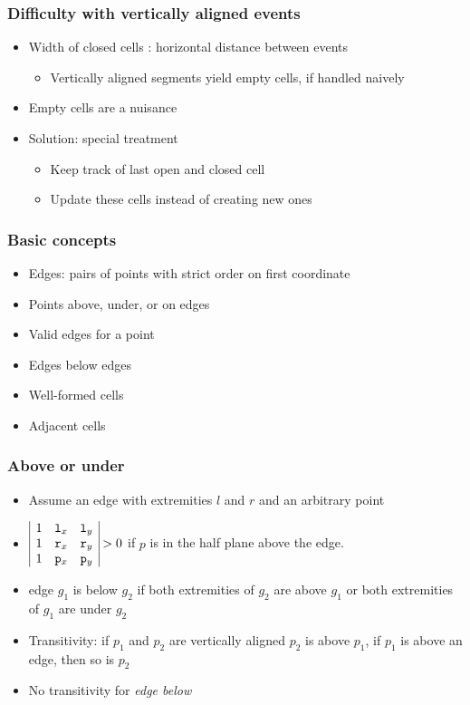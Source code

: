 \documentclass[compress]{beamer}
\begin{document}
\begin{frame}
\frametitle{Difficulty with vertically aligned events}
\begin{itemize}
\item  Width of closed cells : horizontal distance between events
\begin{itemize}
\item Vertically aligned segments yield empty cells, if handled naively
\end{itemize}
\item Empty cells are a nuisance
\item Solution: special treatment
\begin{itemize}
\item Keep track of last open and closed cell
\item Update these cells instead of creating new ones
\end{itemize}
\end{itemize}
\end{frame}
\begin{frame}
\frametitle{Basic concepts}
\begin{itemize}
\item Edges: pairs of points with strict order on first coordinate
\item Points above, under, or on edges
\item Valid edges for a point
\item Edges below edges
\item Well-formed cells
\item Adjacent cells
\end{itemize}
\end{frame}
\begin{frame}
\frametitle{Above or under}
\begin{itemize}
\item Assume an edge with extremities \(l\) and \(r\) and an arbitrary point
\item \(\begin{array}{|ccc|}
1 & {\tt l}_x & {\tt l}_y\\
1 & {\tt r}_x & {\tt r}_y\\
1 & {\tt p}_x & {\tt p}_y\\
\end{array} > 0 \)
\quad if \(p\) is in the half plane above the edge.
\item edge \(g_1\) is below \(g_2\) if both extremities of \(g_2\) are above
\(g_1\) or both extremities of \(g_1\) are under \(g_2\)
\item Transitivity: if \(p_1\) and \(p_2\) are vertically aligned \(p_2\) is
above \(p_1\), if \(p_1\) is above an edge, then so is \(p_2\)
\item No transitivity for {\em edge below}
\end{itemize}
\end{frame}
\end{document}
